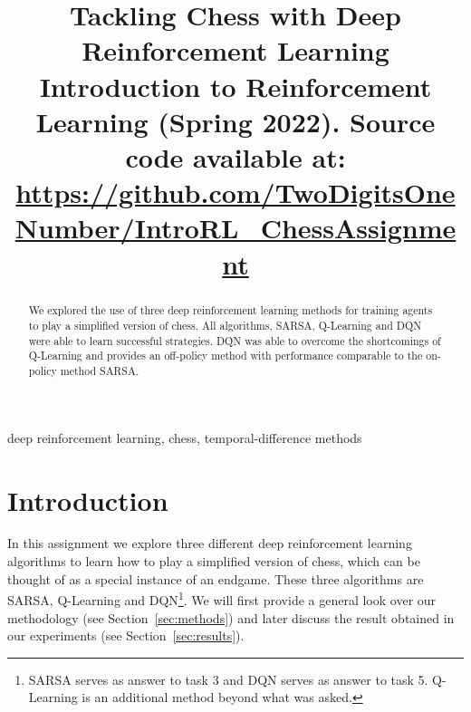 \documentclass[conference]{IEEEtran}
\begin{document}
\title{Tackling Chess with Deep Reinforcement Learning\\
{\footnotesize Introduction to Reinforcement Learning (Spring 2022). Source code available at:
 \href{https://github.com/TwoDigitsOneNumber/IntroRL\_ChessAssignment}{https://github.com/TwoDigitsOneNumber/IntroRL\_ChessAssignment}}
}

\author{
}

\maketitle

\begin{abstract}
    We explored the use of three deep reinforcement learning methods for training agents to play a simplified version of chess. All algorithms, SARSA, Q-Learning and DQN were able to learn successful strategies. DQN was able to overcome the shortcomings of Q-Learning and provides an off-policy method with performance comparable to the on-policy method SARSA.
\end{abstract}

\begin{IEEEkeywords}
    deep reinforcement learning, chess, temporal-difference methods
\end{IEEEkeywords}







\section{Introduction}\label{sec:introduction}


In this assignment we explore three different deep reinforcement learning algorithms to learn how to play a simplified version of chess, which can be thought of as a special instance of an endgame. These three algorithms are SARSA, Q-Learning and DQN\footnote{SARSA serves as answer to task 3 and DQN serves as answer to task 5. Q-Learning is an additional method beyond what was asked.}. We will first provide a general look over our methodology (see Section~\ref{sec:methods}) and later discuss the result obtained in our experiments (see Section~\ref{sec:results}).
\end{document}
